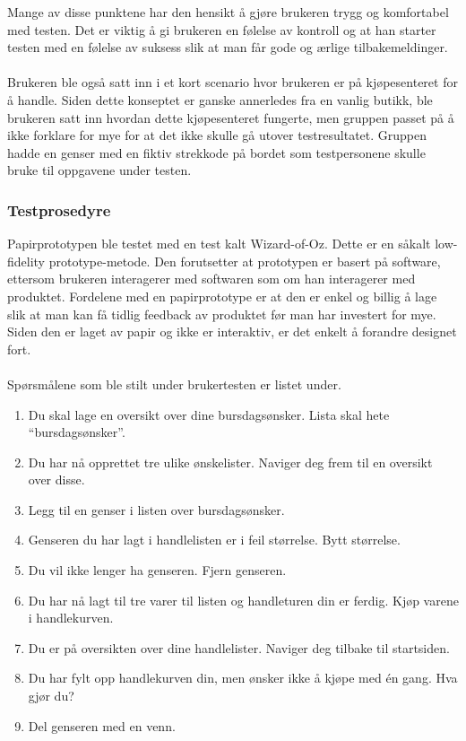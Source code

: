 \noindent Mange av disse punktene har den hensikt å gjøre brukeren trygg og komfortabel med testen. Det er viktig å gi brukeren en følelse av kontroll og at han starter testen med en følelse av suksess slik at man får gode og ærlige tilbakemeldinger.
\\\\
Brukeren ble også satt inn i et kort scenario hvor brukeren er på kjøpesenteret for å handle. Siden dette konseptet er ganske annerledes fra en vanlig butikk, ble brukeren satt inn hvordan dette kjøpesenteret fungerte, men gruppen passet på å ikke forklare for mye for at det ikke skulle gå utover testresultatet. Gruppen hadde en genser med en fiktiv strekkode på bordet som testpersonene skulle bruke til oppgavene under testen.

\subsubsection{Testprosedyre}
Papirprototypen ble testet med en test kalt Wizard-of-Oz. Dette er en såkalt low-fidelity prototype-metode\cite[p.~391]{preece}. Den forutsetter at prototypen er basert på software, ettersom brukeren interagerer med softwaren som om han interagerer med produktet. Fordelene med en papirprototype er at den er enkel og billig å lage slik at man kan få tidlig feedback av produktet før man har investert for mye. Siden den er laget av papir og ikke er interaktiv, er det enkelt å forandre designet fort. 
\\\\
Spørsmålene som ble stilt under brukertesten er listet under.

\begin{enumerate}
    \item Du skal lage en oversikt over dine bursdagsønsker. Lista skal hete “bursdagsønsker”.
    \item Du har nå opprettet tre ulike ønskelister. Naviger deg frem til en oversikt over disse.
    \item Legg til en genser i listen over bursdagsønsker. 
    \item Genseren du har lagt i handlelisten er i feil størrelse. Bytt størrelse.
    \item Du vil ikke lenger ha genseren. Fjern genseren.
    \item Du har nå lagt til tre varer til listen og handleturen din er ferdig. Kjøp varene i handlekurven.
    \item Du er på oversikten over dine handlelister. Naviger deg tilbake til startsiden.
    \item Du har fylt opp handlekurven din, men ønsker ikke å kjøpe med én gang. Hva gjør du?
    \item Del genseren med en venn.
\end{enumerate}

